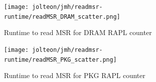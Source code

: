 \documentclass{article}
\begin{document}
    \begin{figure}[H]
	    \centering
	    \texttt{[image: jolteon/jmh/readmsr-runtime/readMSR\_DRAM\_scatter.png]}
	    \caption{Runtime to read MSR for DRAM RAPL counter}
	    \label{fig:DRAM-rapl-counter}
    \end{figure}
    
    \begin{figure}[H]
	    \centering
	    \texttt{[image: jolteon/jmh/readmsr-runtime/readMSR\_PKG\_scatter.png]}
	    \caption{Runtime to read MSR for PKG RAPL counter}
	    \label{fig:PKG-rapl-counter}
    \end{figure}
    
    
\end{document}
